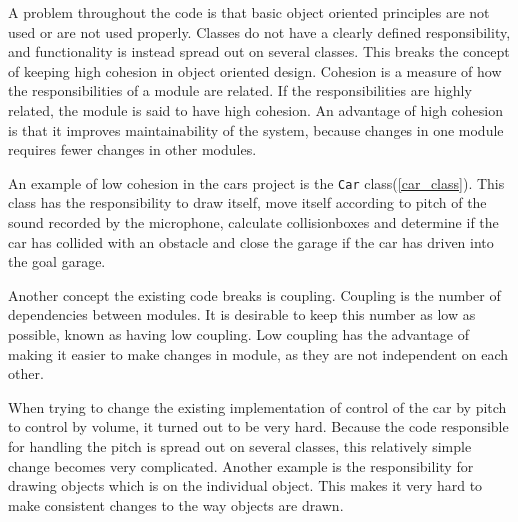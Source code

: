 A problem throughout the code is that basic object oriented principles are not used or are not used properly. 
Classes do not have a clearly defined responsibility, and functionality is instead spread out on several classes. 
This breaks the concept of keeping high cohesion in object oriented design. 
Cohesion is a measure of how the responsibilities of a module are related. 
If the responsibilities are highly related, the module is said to have high cohesion.
An advantage of high cohesion is that it improves maintainability of the system, because changes in one module requires fewer changes in other modules. 

An example of low cohesion in the cars project is the \lstinline!Car! class(\cref{car_class}).
This class has the responsibility to draw itself, move itself according to pitch of the sound recorded by the microphone, calculate collisionboxes and determine if the car has collided with an obstacle and close the garage if the car has driven into the goal garage.

Another concept the existing code breaks is coupling.
Coupling is the number of  dependencies between modules.
It is desirable to keep this number as low as possible, known as having low coupling.
Low coupling has the advantage of making it easier to make changes in module, as they are not independent on each other.

When trying to change the existing implementation of control of the car by pitch to control by volume, it turned out to be very hard.
Because the code responsible for handling the pitch is spread out on several classes, this relatively simple change becomes very complicated.
Another example is the responsibility for drawing objects which is on the individual object. 
This makes it very hard to make consistent changes to the way objects are drawn.
